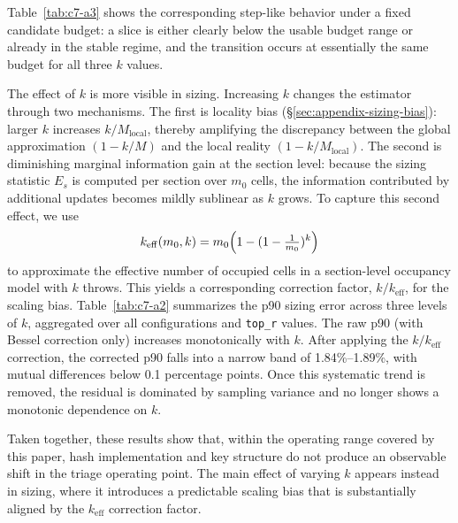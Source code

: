 Table~\ref{tab:c7-a3} shows the corresponding step-like behavior under a fixed candidate budget: a slice is either clearly below the usable budget range or already in the stable regime, and the transition occurs at essentially the same budget for all three $k$ values.

The effect of $k$ is more visible in sizing. Increasing $k$ changes the estimator through two mechanisms. The first is locality bias (\S\ref{sec:appendix-sizing-bias}): larger $k$ increases $k/M_{\text{local}}$, thereby amplifying the discrepancy between the global approximation $(1{-}k/M)$ and the local reality $(1{-}k/M_{\text{local}})$. The second is diminishing marginal information gain at the section level: because the sizing statistic $E_s$ is computed per section over $m_0$ cells, the information contributed by additional updates becomes mildly sublinear as $k$ grows. To capture this second effect, we use
\[
k_{\mathrm{eff}}(m_0,k) = m_0\Bigl(1-(1-\tfrac{1}{m_0})^k\Bigr)
\]
to approximate the effective number of occupied cells in a section-level occupancy model with $k$ throws. This yields a corresponding correction factor, $k/k_{\mathrm{eff}}$, for the scaling bias. Table~\ref{tab:c7-a2} summarizes the p90 sizing error across three levels of $k$, aggregated over all configurations and \texttt{top\_r} values. The raw p90 (with Bessel correction only) increases monotonically with $k$. After applying the $k/k_{\mathrm{eff}}$ correction, the corrected p90 falls into a narrow band of 1.84\%--1.89\%, with mutual differences below 0.1 percentage points. Once this systematic trend is removed, the residual is dominated by sampling variance and no longer shows a monotonic dependence on $k$.



Taken together, these results show that, within the operating range covered by this paper, hash implementation and key structure do not produce an observable shift in the triage operating point. The main effect of varying $k$ appears instead in sizing, where it introduces a predictable scaling bias that is substantially aligned by the $k_{\mathrm{eff}}$ correction factor.
